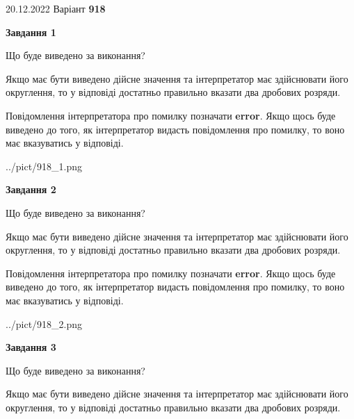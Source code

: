 \documentclass[12pt, ukrainian]{article}
\begin{document}
{20.12.2022 Варіант \No \textbf { 918 }\par}
{
\begin {Large}

{\begin {center}\textbf{Завдання 1}\end {center}}\par
Що буде виведено за виконання? \par

Якщо має бути виведено дійсне значення та інтерпретатор має здійснювати його округлення, 
то у відповіді достатньо правильно вказати два дробових розряди.

Повідомлення інтерпретатора про помилку позначати \textbf{error}.
Якщо щось буде виведено до того, як інтерпретатор видасть повідомлення про помилку, 
то воно має вказуватись у відповіді. \par

\begin{center}
	{../pict/918_1.png}
\end{center}
\newpage

{\begin {center}\textbf{Завдання 2}\end {center}}\par
Що буде виведено за виконання? \par

Якщо має бути виведено дійсне значення та інтерпретатор має здійснювати його округлення, 
то у відповіді достатньо правильно вказати два дробових розряди.

Повідомлення інтерпретатора про помилку позначати \textbf{error}.
Якщо щось буде виведено до того, як інтерпретатор видасть повідомлення про помилку, 
то воно має вказуватись у відповіді. \par

\begin{center}
	{../pict/918_2.png}
\end{center}
\newpage

{\begin {center}\textbf{Завдання 3}\end {center}}\par
Що буде виведено за виконання? \par

Якщо має бути виведено дійсне значення та інтерпретатор має здійснювати його округлення, 
то у відповіді достатньо правильно вказати два дробових розряди.


\end{Large}}
\end{document}
